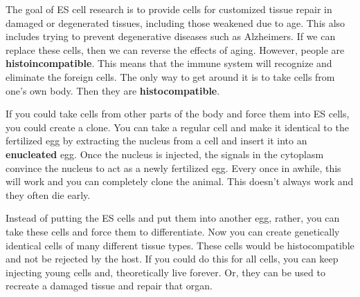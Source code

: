 \documentclass{article}
\begin{document}
The goal of ES cell research is to provide cells for customized tissue repair in
damaged or degenerated tissues, including those weakened due to age. This also
includes trying to prevent degenerative diseases such as Alzheimers. If we can
replace these cells, then we can reverse the effects of aging. However, people
are \textbf{histoincompatible}. This means that the immune system will recognize
and eliminate the foreign cells. The only way to get around it is to take cells
from one's own body. Then they are \textbf{histocompatible}.

If you could take cells from other parts of the body and force them into ES
cells, you could create a clone. You can take a regular cell and make it
identical to the fertilized egg by extracting the nucleus from a cell and insert
it into an \textbf{enucleated} egg. Once the nucleus is injected, the signals in
the cytoplasm convince the nucleus to act as a newly fertilized egg. Every once
in awhile, this will work and you can completely clone the animal. This doesn't
always work and they often die early.

Instead of putting the ES cells and put them into another egg, rather, you can
take these cells and force them to differentiate. Now you can create genetically
identical cells of many different tissue types.  These cells would be
histocompatible and not be rejected by the host. If you could do this for all
cells, you can keep injecting young cells and, theoretically live forever. Or,
they can be used to recreate a damaged tissue and repair that organ.
\end{document}
